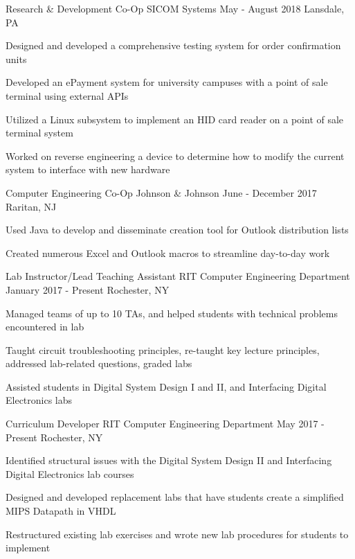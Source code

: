 
\begin{cvexperiences}
	\cvexperience
		{Research \& Development Co-Op}
		{SICOM Systems}
		{May - August 2018}
		{Lansdale, PA}
		{
			\begin{cvitems}
			\item {Designed and developed a comprehensive testing system for order confirmation units}
			\item {Developed an ePayment system for university campuses with a point of sale terminal using external APIs}
			\item {Utilized a Linux subsystem to implement an HID card reader on a point of sale terminal system}
			\item {Worked on reverse engineering a device to determine how to modify the current system to interface with new hardware}
			\end{cvitems}
		}

	\cvexperience
		{Computer Engineering Co-Op}
		{Johnson \& Johnson}
		{June - December 2017}
		{Raritan, NJ}
		{
			\begin{cvitems}
			\item {Used Java to develop and disseminate creation tool for Outlook distribution lists}
			\item {Created numerous Excel and Outlook macros to streamline day-to-day work}
			\end{cvitems}
		}

	\cvexperience
		{Lab Instructor/Lead Teaching Assistant}
		{RIT Computer Engineering Department}
		{January 2017 - Present}
		{Rochester, NY}
		{
			\begin{cvitems}
			\item{Managed teams of up to 10 TAs, and helped students with technical problems encountered in lab}
			\item{Taught circuit troubleshooting principles, re-taught key lecture principles, addressed lab-related questions, graded labs}
			\item{Assisted students in Digital System Design I and II, and Interfacing Digital Electronics labs}
			\end{cvitems}
		}

	\cvexperience
		{Curriculum Developer}
		{RIT Computer Engineering Department}
		{May 2017 - Present}
		{Rochester, NY}
		{
			\begin{cvitems}
			\item {Identified structural issues with the Digital System Design II and Interfacing Digital Electronics lab courses}
			\item {Designed and developed replacement labs that have students create a simplified MIPS Datapath in VHDL}
			\item {Restructured existing lab exercises and wrote new lab procedures for students to implement}
			\end{cvitems}
		}


\end{cvexperiences}

